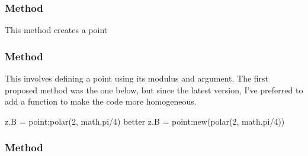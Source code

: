 \subsubsection{Method  } %
\label{ssub:method_point_new}

This method creates a point

\begin{tkzexample}[latex = 7cm]
\end{tkzexample}


\subsubsection{Method } %
\label{ssub:method_point_polar}

This involves defining a point using its modulus and argument.
The first proposed method was the one below, but since the latest version, I've preferred to 
add a  function to make the code more homogeneous. 
 
\begin{mybox}
\begin{SVerbatim}
  z.B = point:polar(2, math.pi/4)
  better 
  z.B = point:new(polar(2, math.pi/4))
\end{SVerbatim}
\end{mybox}

\begin{tkzexample}[latex = 7cm]
\begin{center}
\end{center}

\end{tkzexample}


\subsubsection{Method } %
\label{ssub:method_point_polar_deg}


